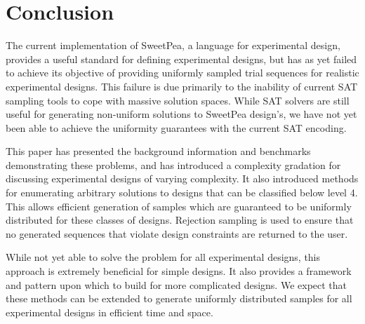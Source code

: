 
\chapter{Conclusion}

The current implementation of SweetPea, a language for experimental design, provides a useful standard for defining experimental designs, but has as yet failed to achieve its objective of providing uniformly sampled trial sequences for realistic experimental designs. This failure is due primarily to the inability of current SAT sampling tools to cope with massive solution spaces. While SAT solvers are still useful for generating non-uniform solutions to SweetPea design's, we have not yet been able to achieve the uniformity guarantees with the current SAT encoding.

This paper has presented the background information and benchmarks demonstrating these problems, and has introduced a complexity gradation for discussing experimental designs of varying complexity. It also introduced methods for enumerating arbitrary solutions to designs that can be classified below level 4. This allows efficient generation of samples which are guaranteed to be uniformly distributed for these classes of designs. Rejection sampling is used to ensure that no generated sequences that violate design constraints are returned to the user.

While not yet able to solve the problem for all experimental designs, this approach is extremely beneficial for simple designs. It also provides a framework and pattern upon which to build for more complicated designs. We expect that these methods can be extended to generate uniformly distributed samples for all experimental designs in efficient time and space.



